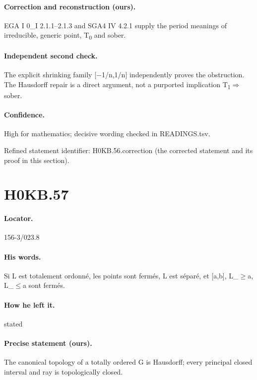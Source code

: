 \paragraph{Correction and reconstruction (ours).} EGA I 0\_I 2.1.1–2.1.3 and SGA4 IV 4.2.1 supply the period meanings of irreducible, generic point, T\textsubscript{0} and sober.

\paragraph{Independent second check.} The explicit shrinking family [\ensuremath{-}1/n,1/n] independently proves the obstruction. The Hausdorff repair is a direct argument, not a purported implication T\textsubscript{1}\ensuremath{\Rightarrow}sober.

\paragraph{Confidence.} High for mathematics; decisive wording checked in READINGS.tsv.

\noindent Refined statement identifier: H0KB.56.correction (the corrected statement and its proof in this section).

\section*{H0KB.57}\label{statement:H0KB.57}
\paragraph{Locator.} 156-3/023.8

\paragraph{His words.} Si L est totalement ordonné, les points sont fermés, L est séparé, et [a,b], L\_\ensuremath{\geq}a, L\_\ensuremath{\leq}a sont fermés.

\paragraph{How he left it.} stated

\paragraph{Precise statement (ours).} The canonical topology of a totally ordered G is Hausdorff; every principal closed interval and ray is topologically closed.

